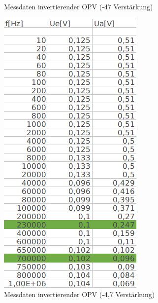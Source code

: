 \documentclass[12pt,a4paper,titlepage]{article}
\begin{document}
\begin{figure}[H]
\begin{minipage}[b]{0.4\textwidth}
    \caption{Messdaten invertierender OPV (-47 Verstärkung)}
  \end{minipage}
  \hfill
  \begin{minipage}[b]{0.4\textwidth}
    \includegraphics[width=\textwidth]{daten_4_7.png}
    \caption{Messdaten invertierender OPV (-4,7 Verstärkung)}
  \end{minipage}
\end{figure}
\end{document}
